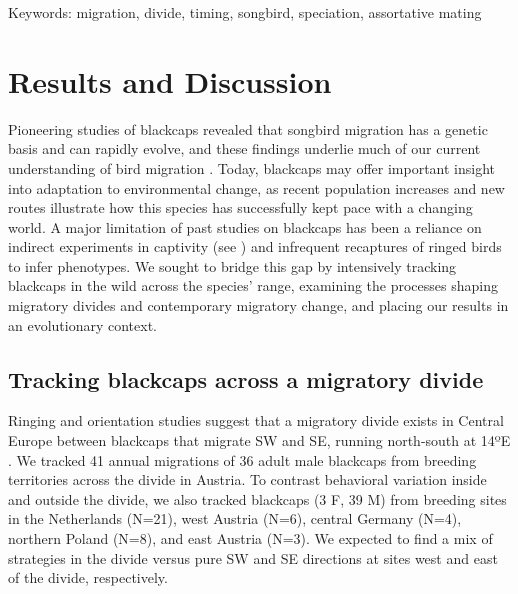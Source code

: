 \documentclass[a4paper, twoside]{templates/ociamthesis}
\begin{document}
Keywords: migration, divide, timing, songbird, speciation, assortative mating

\hypertarget{results-and-discussion}{%
\section{Results and Discussion}\label{results-and-discussion}}

Pioneering studies of blackcaps revealed that songbird migration has a genetic basis and can rapidly evolve, and these findings underlie much of our current understanding of bird migration \autocite{bearhopAssortativeMatingMechanism2005,bertholdEvolutionaryAspectsMigratory1988,bertholdHeritabilityMigratoryActivity1994,bertholdRapidMicroevolutionMigratory1992,helbigGeneticBasisMode1996,helbigInheritanceMigratoryDirection1991,muellerIdentificationGeneAssociated2011,pulidoCurrentSelectionLower2010,pulidoFrequencyMigrantsMigratory1996,pulidoGeneticsEvolutionAvian2007,pulidoHeritabilityTimingAutumn2001,rolshausenContemporaryEvolutionReproductive2009}.
Today, blackcaps may offer important insight into adaptation to environmental change, as recent population increases \autocite{ebcc/birdlife/rspb/csoTrendsCommonBirds2018} and new routes \autocite{bertholdRapidMicroevolutionMigratory1992} illustrate how this species has successfully kept pace with a changing world.
A major limitation of past studies on blackcaps has been a reliance on indirect experiments in captivity (see \autocite{vandorenProgrammedFlexibleLongterm2017,zunigaAbruptSwitchMigratory2016}) and infrequent recaptures of ringed birds to infer phenotypes.
We sought to bridge this gap by intensively tracking blackcaps in the wild across the species' range, examining the processes shaping migratory divides and contemporary migratory change, and placing our results in an evolutionary context.

\hypertarget{tracking-blackcaps-across-a-migratory-divide}{%
\subsection{Tracking blackcaps across a migratory divide}\label{tracking-blackcaps-across-a-migratory-divide}}

Ringing and orientation studies suggest that a migratory divide exists in Central Europe between blackcaps that migrate SW and SE, running north-south at 14ºE \autocite{helbigPopulationDifferentiationMigratory1992,helbigSESWmigratingBlackcap1991}. We tracked 41 annual migrations of 36 adult male blackcaps from breeding territories across the divide in Austria. To contrast behavioral variation inside and outside the divide, we also tracked blackcaps (3 F, 39 M) from breeding sites in the Netherlands (N=21), west Austria (N=6), central Germany (N=4), northern Poland (N=8), and east Austria (N=3). We expected to find a mix of strategies in the divide versus pure SW and SE directions at sites west and east of the divide, respectively.
\end{document}
